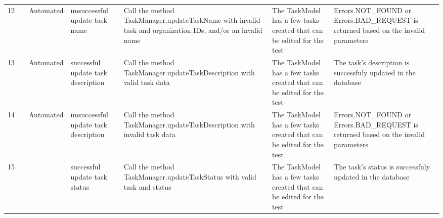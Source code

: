 \documentclass{article}
\begin{document}
{\begin{tabular}{|l|c|l|l|l|l|l|}
    \rowcolor[HTML]{FFFFFF}
    12                                                            & \cellcolor[HTML]{FFFFFF}                                                     & {\color[HTML]{11734B} Automated}                                & unsuccessful update task name                  & Call the method TaskManager.updateTaskName with invalid task and organization IDs, and/or an invalid name                        & The TaskModel has a few tasks created that can be edited for the test                          & Errors.NOT\_FOUND or Errors.BAD\_REQUEST is returned based on the invalid parameters                                          \\ \cline{1-1} \cline{3-7}
    \rowcolor[HTML]{FFFFFF}
    13                                                            & \cellcolor[HTML]{FFFFFF}                                                     & {\color[HTML]{11734B} Automated}                                & successful update task description             & Call the method TaskManager.updateTaskDescription with valid task data                                                           & The TaskModel has a few tasks created that can be edited for the test                          & The task's description is successfuly updated in the database                                                                 \\ \cline{1-1} \cline{3-7}
    \rowcolor[HTML]{FFFFFF}
    14                                                            & \cellcolor[HTML]{FFFFFF}                                                     & {\color[HTML]{11734B} Automated}                                & unsuccessful update task description           & Call the method TaskManager.updateTaskDescription with invalid task data                                                         & The TaskModel has a few tasks created that can be edited for the test                          & Errors.NOT\_FOUND or Errors.BAD\_REQUEST is returned based on the invalid parameters                                          \\ \cline{1-1} \cline{3-7}
    \cellcolor[HTML]{FFFFFF}15                                    & \cellcolor[HTML]{FFFFFF}                                                     & \cellcolor[HTML]{FFFFFF}{\color[HTML]{11734B} Automated}        & successful update task status                  & \cellcolor[HTML]{FFFFFF}Call the method TaskManager.updateTaskStatus with valid task and status                                  & \cellcolor[HTML]{FFFFFF}The TaskModel has a few tasks created that can be edited for the test  & \cellcolor[HTML]{FFFFFF}The task's status is successfuly updated in the database                                              \\ \cline{1-1} \cline{3-7}

\end{tabular}}
\end{document}
